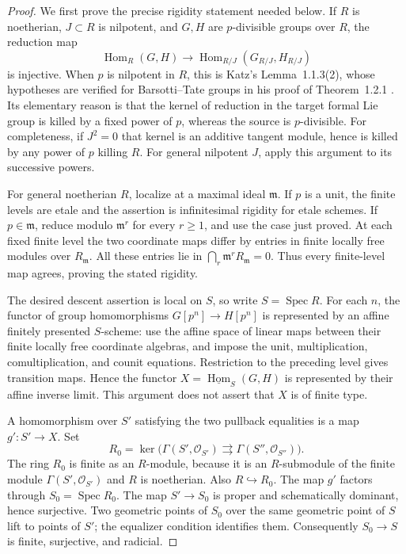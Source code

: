 \begin{proof}
We first prove the precise rigidity statement needed below. If $R$ is
noetherian, $J\subset R$ is nilpotent, and $G,H$ are $p$-divisible groups over
$R$, the reduction map
\[
 \operatorname{Hom}_R(G,H)\longrightarrow
 \operatorname{Hom}_{R/J}(G_{R/J},H_{R/J})
\]
is injective. When $p$ is nilpotent in $R$, this is Katz's
Lemma~1.1.3(2), whose hypotheses are verified for Barsotti--Tate groups in
his proof of Theorem~1.2.1 \cite{Katz1981SerreTate}. Its elementary reason is
that the kernel of reduction in the target formal Lie group is killed by
a fixed power of $p$, whereas the source is $p$-divisible. For completeness,
if $J^2=0$ that kernel is an additive tangent module, hence is killed by
any power of $p$ killing $R$. For general nilpotent $J$, apply this argument
to its successive powers.

For general noetherian $R$, localize at a maximal ideal $\mathfrak m$.
If $p$ is a unit, the finite levels are etale and the assertion is
infinitesimal rigidity for etale schemes. If $p\in\mathfrak m$, reduce
modulo $\mathfrak m^r$ for every $r\geq1$, and use the case just proved.
At each fixed finite level the two coordinate maps differ by entries in
finite locally free modules over $R_{\mathfrak m}$. All these entries lie
in $\bigcap_r\mathfrak m^rR_{\mathfrak m}=0$. Thus every finite-level map
agrees, proving the stated rigidity.

The desired descent assertion is local on $S$, so write $S=\operatorname{Spec}R$.
For each $n$, the functor of group homomorphisms
$G[p^n]\to H[p^n]$ is represented by an affine finitely presented
$S$-scheme: use the affine space of linear maps between their finite
locally free coordinate algebras, and impose the unit, multiplication,
comultiplication, and counit equations. Restriction to the preceding
level gives transition maps. Hence the functor
$X=\underline{\operatorname{Hom}}_S(G,H)$ is represented by their affine
inverse limit. This argument does not assert that $X$ is of finite type.

A homomorphism over $S'$ satisfying the two pullback equalities is a map
$g':S'\to X$. Set
\[
 R_0=\ker\bigl(\Gamma(S',\mathcal O_{S'})
 \rightrightarrows\Gamma(S'',\mathcal O_{S''})\bigr).
\]
The ring $R_0$ is finite as an $R$-module, because it is an $R$-submodule
of the finite module $\Gamma(S',\mathcal O_{S'})$ and $R$ is noetherian.
Also $R\hookrightarrow R_0$. The map $g'$ factors through
$S_0=\operatorname{Spec}R_0$. The map $S'\to S_0$ is proper and
schematically dominant, hence surjective. Two geometric points of $S_0$
over the same geometric point of $S$ lift to points of $S'$; the equalizer
condition identifies them. Consequently $S_0\to S$ is finite, surjective,
and radicial.


\end{proof}
